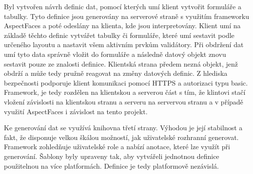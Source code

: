 Byl vytvořen návrh definic dat, pomocí kterých umí klient vytvořit formuláře a tabulky. Tyto definice jsou generovány na serverové straně s využitím frameworku AspectFaces a poté odeslány na klienta, kde jsou interpretovány. Klient umí na základě těchto definic vytvářet tabulky či formuláře, které umí sestavit podle určeného layoutu a nastavit všem aktivním prvkům validátory. Při obdržení dat umí tyto data správně vložit do formuláře a následně datový objekt znovu sestavit pouze ze znalosti definice. Klientská strana předem nezná objekt, jenž obdrží a může tedy pružně reagovat na změny datových definic. Z hlediska bezpečnosti podporuje klient komunikaci pomocí HTTPS a autorizaci typu basic. Framework, je tedy rozdělen na klientskou a serverou část s tím, že klintovi stačí vložení závislosti na klientskou stranu a serveru na servervou stranu a v případě využití AspectFaces i závislost na tento projekt.

Ke generování dat se využívá knihovna třetí strany. Výhodou je její stabilnost a fakt, že disponuje velkou škálou možností, jak uživatelské rozhranní generovat. Framework zohledňuje uživatelské role a nabízí anotace, které lze využít při generování. Šablony byly upraveny tak, aby vytvářeli jednotnou definice použitelnou na více platformách. Definice je tedy platformově nezávislá. 




